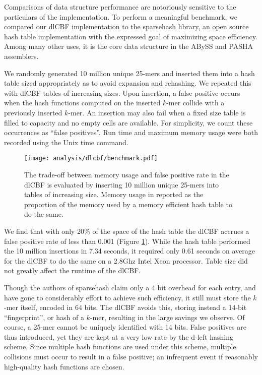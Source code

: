 \documentclass[twocolumn]{article}
\begin{document}
Comparisons of data structure performance are notoriously sensitive to the
particulars of the implementation. To perform a meaningful benchmark, we
compared our dlCBF implementation to the sparsehash library, an open source
hash table implementation with the expressed goal of maximizing space
efficiency. Among many other uses, it is the core data structure in the ABySS
\citep{Simpson2011} and PASHA \citep{Liu2011} assemblers.

We randomly generated 10 million unique 25-mers and inserted them into a hash
table sized appropriately as to avoid expansion and rehashing. We repeated
this with dlCBF tables of increasing sizes. Upon insertion, a false positive
occurs when the hash functions computed on the inserted $k$-mer collide with a
previously inserted $k$-mer. An insertion may also fail when a fixed size
table is filled to capacity and no empty cells are available. For simplicity,
we count these occurrences as ``false positives''. Run time and maximum memory
usage were both recorded using the Unix time command.

\begin{figure}[h]
\centerline{\texttt{[image: analysis/dlcbf/benchmark.pdf]}}
\caption{
The trade-off between memory usage and false positive rate in the dlCBF is
evaluated by inserting 10 million unique 25-mers into tables of increasing
size. Memory usage in reported as the proportion of the memory used by a
memory efficient hash table to do the same.
}
\label{fig:dlcbf_bench}
\end{figure}

We find that with only 20\% of the space of the hash table the dlCBF accrues a
false positive rate of less than 0.001 (Figure \ref{fig:dlcbf_bench}). While
the hash table performed the 10 million insertions in 7.34 seconds, it
required only 0.61 seconds on average for the dlCBF to do the same on a 2.8Ghz
Intel Xeon processor. Table size did not greatly affect the runtime of the
dlCBF.

Though the authors of sparsehash claim only a 4 bit overhead for each entry,
and have gone to considerably effort to achieve such efficiency, it still must
store the $k$-mer itself, encoded in 64 bits. The dlCBF avoids this, storing
instead a 14-bit ``fingerprint'', or hash of a $k$-mer, resulting in the large
savings we observe. Of course, a 25-mer cannot be uniquely identified with 14
bits. False positives are thus introduced, yet they are kept at a very low
rate by the d-left hashing scheme. Since multiple hash functions are used
under this scheme, multiple collisions must occur to result in a false
positive; an infrequent event if reasonably high-quality hash functions are
chosen.
\end{document}
